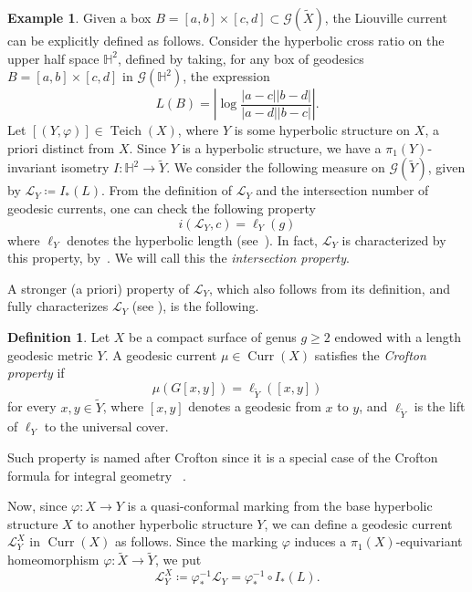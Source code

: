 \documentclass[12pt,article]{amsart}
\numberwithin{equation}{section}
\numberwithin{figure}{section}
\theoremstyle{definition}
\newtheorem{example}[equation]{Example}
\newtheorem{definition}[equation]{Definition}
\theoremstyle{plain}
\DeclareMathOperator{\Curr}{Curr}
\DeclareMathOperator{\Teich}{Teich}
\newcommand*{\wt}[1]{\widetilde{#1}}
\begin{document}
\begin{example}
\label{ex:Liouville}
Given a box $B= [a,b] \times [c,d] \subset \mathcal{G}(\wt{X} )$, the Liouville current can be explicitly defined as follows.
Consider the hyperbolic cross ratio on the upper half space $\mathbb{H}^2$, defined by taking, for any box of geodesics $B=[a,b] \times [c,d]$ in $\mathcal{G}(\mathbb{H}^2)$, the expression
\[
L(B) = \left| \log \frac{|a-c||b-d|}{|a-d||b-c|} \right|.
\]
Let $[(Y,\varphi)] \in \Teich(X)$, where $Y$ is some hyperbolic structure on $X$, a  priori distinct from $X$.
Since $Y$ is a hyperbolic structure, we have a $\pi_1(Y)$-invariant isometry $I \colon \mathbb{H}^2 \to \wt{Y}$.
We consider the following measure on $\mathcal{G}(\wt{Y})$, given by $\mathcal{L}_Y \coloneqq I_* (L)$.
From the definition of $\mathcal{L}_Y$ and the intersection number of geodesic currents, one can check the following property
\[
i(\mathcal{L}_Y, c)=\ell_{Y}(g)
\]
where $\ell_Y$ denotes the hyperbolic length (see~\cite[Proposition~14]{Bonahon88:GeodesicCurrent}).
In fact, $\mathcal{L}_Y$ is characterized by this property, by~\cite[Th\'eor\`eme~2]{Otal90:SpectreMarqueNegative}.
We will call this the \emph{intersection property}.

A stronger (a priori) property of 
$\mathcal{L}_Y$, which also follows from its definition, and fully characterizes $\mathcal{L}_Y$ (see \cite[Proposition 8.1.12]{Martelli16:IntroGeoTop}), is the following. 
\begin{definition}
   Let $X$ be a compact surface of genus $g \geq 2$ endowed with a length geodesic metric $Y$. A geodesic current $\mu \in \Curr (X)$ satisfies the \emph{Crofton property} if
    \[
    \mu (G [x,y]) = \ell_{\wt{Y}} ([x,y])
    \]
    for every $x, y \in \wt{Y}$, where $[x,y]$ denotes a geodesic from $x$ to $y$, and $\ell_{\wt{Y}}$ is the lift of $\ell_Y$ to the universal cover. 
\end{definition}



Such property is named after Crofton since it is a special case of the Crofton formula for integral geometry ~\cite[19]{Sa04:Integral}. 

Now, since
$\varphi \colon X \to Y$ is a quasi-conformal marking from the base hyperbolic structure $X$ to another hyperbolic structure $Y$, we can define a geodesic  current $\mathcal{L}_Y^X$ in $\Curr(X)$ as follows.
Since the marking $\varphi$ induces a $\pi_1(X)$-equivariant homeomorphism $\varphi \colon \wt{X} \to \wt{Y}$, we put
\[
\mathcal{L}_Y^X \coloneqq \varphi^{-1}_* \mathcal{L}_Y =  \varphi^{-1}_* \circ I_* (L).
\]


\end{example}
\end{document}
